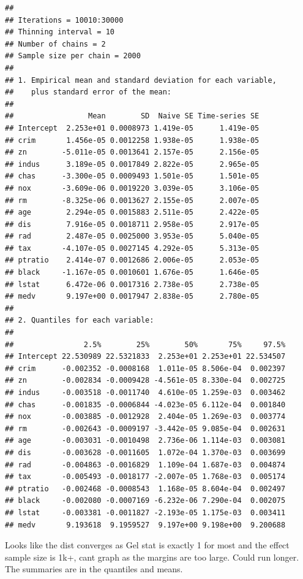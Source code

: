 \documentclass[
]{article}
\begin{document}
\begin{verbatim}
## 
## Iterations = 10010:30000
## Thinning interval = 10 
## Number of chains = 2 
## Sample size per chain = 2000 
## 
## 1. Empirical mean and standard deviation for each variable,
##    plus standard error of the mean:
## 
##                 Mean        SD  Naive SE Time-series SE
## Intercept  2.253e+01 0.0008973 1.419e-05      1.419e-05
## crim       1.456e-05 0.0012258 1.938e-05      1.938e-05
## zn        -5.011e-05 0.0013641 2.157e-05      2.156e-05
## indus      3.189e-05 0.0017849 2.822e-05      2.965e-05
## chas      -3.300e-05 0.0009493 1.501e-05      1.501e-05
## nox       -3.609e-06 0.0019220 3.039e-05      3.106e-05
## rm        -8.325e-06 0.0013627 2.155e-05      2.007e-05
## age        2.294e-05 0.0015883 2.511e-05      2.422e-05
## dis        7.916e-05 0.0018711 2.958e-05      2.917e-05
## rad        2.487e-05 0.0025000 3.953e-05      5.040e-05
## tax       -4.107e-05 0.0027145 4.292e-05      5.313e-05
## ptratio    2.414e-07 0.0012686 2.006e-05      2.053e-05
## black     -1.167e-05 0.0010601 1.676e-05      1.646e-05
## lstat      6.472e-06 0.0017316 2.738e-05      2.738e-05
## medv       9.197e+00 0.0017947 2.838e-05      2.780e-05
## 
## 2. Quantiles for each variable:
## 
##                2.5%        25%        50%       75%     97.5%
## Intercept 22.530989 22.5321833  2.253e+01 2.253e+01 22.534507
## crim      -0.002352 -0.0008168  1.011e-05 8.506e-04  0.002397
## zn        -0.002834 -0.0009428 -4.561e-05 8.330e-04  0.002725
## indus     -0.003518 -0.0011740  4.610e-05 1.259e-03  0.003462
## chas      -0.001835 -0.0006844 -4.023e-05 6.112e-04  0.001840
## nox       -0.003885 -0.0012928  2.404e-05 1.269e-03  0.003774
## rm        -0.002643 -0.0009197 -3.442e-05 9.085e-04  0.002631
## age       -0.003031 -0.0010498  2.736e-06 1.114e-03  0.003081
## dis       -0.003628 -0.0011605  1.072e-04 1.370e-03  0.003699
## rad       -0.004863 -0.0016829  1.109e-04 1.687e-03  0.004874
## tax       -0.005493 -0.0018177 -2.007e-05 1.768e-03  0.005174
## ptratio   -0.002468 -0.0008543  1.168e-05 8.604e-04  0.002497
## black     -0.002080 -0.0007169 -6.232e-06 7.290e-04  0.002075
## lstat     -0.003381 -0.0011827 -2.193e-05 1.175e-03  0.003411
## medv       9.193618  9.1959527  9.197e+00 9.198e+00  9.200688
\end{verbatim}

Looks like the dist converges as Gel stat is exactly 1 for most and the
effect sample size is 1k+, cant graph as the margins are too large.
Could run longer. The summaries are in the quantiles and means.
\end{document}
